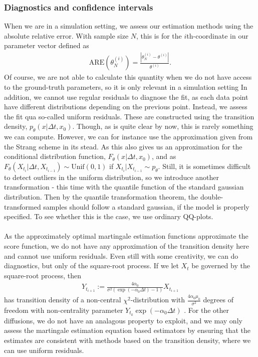 \subsubsection{Diagnostics and confidence intervals}
When we are in a simulation setting, we assess our estimation methods using the absolute relative error. With sample size $N$, this is for the $i$th-coordinate in our parameter vector defined as
\begin{align}
    \mathrm{ARE}\left(\theta_N^{(i)}\right) = \frac{\left|\theta_N^{(i)} - \theta^{(i)}\right|}{\theta^{(i)}}. \label{eq:ARE}
\end{align}
Of course, we are not able to calculate this quantity when we do not have access to the ground-truth parameters, so it is only relevant in a simulation setting In addition, we cannot use regular residuals to diagnose the fit, as each data point have different distributions depending on the previous point. Instead, we assess the fit qua so-called uniform residuals. These are constructed using the transition density, $p_\theta(x|\Delta t, x_0)$. Though, as is quite clear by now, this is rarely something we can compute. However, we can for instance use the approximation given from the Strang scheme in its stead. As this also gives us an approximation for the conditional distribution function, $F_\theta(x|\Delta t, x_0)$, and as $F_\theta(X_{t_{i}}|\Delta t, X_{t_{i - 1}})\sim \mathrm{Unif}(0,1)$ if $X_{t_{i}}|X_{t_{i - 1}} \sim p_\theta$. Still, it is sometimes difficult to detect outliers in the uniform distribution, so we introduce another transformation - this time with the quantile function of the standard gaussian distribution. Then by the quantile transformation theorem, the double-transformed samples should follow a standard gaussian, if the model is properly specified. To see whether this is the case, we use ordinary QQ-plots.\\\\
As the approximately optimal martingale estimation functions approximate the score function, we do not have any approximation of the transition density here and cannot use uniform residuals. Even still with some creativity, we can do diagnostics, but only of the square-root process. If we let $X_t$ be governed by the square-root process, then
\begin{align}
    Y_{t_{i + 1}} := \frac{4\alpha_0}{\sigma^2\left(\exp\left(-\alpha_0 \Delta t\right) - 1\right)}X_{t_{i + 1}}
\end{align}
has transition density of a non-central $\chi^2$-distribution with $\frac{4\alpha_0\mu_0}{\sigma^2}$ degrees of freedom with non-centrality parameter $Y_{t_k}\exp\left(-\alpha_0 \Delta t\right)$ \cite[Equation (5.68)]{Srkk2019}. For the other diffusions, we do not have an analagous property to exploit, and we may only assess the martingale estimation equation based estimators by ensuring that the estimates are consistent with methods based on the transition density, where we can use uniform residuals.\\\\

